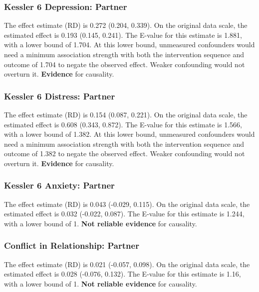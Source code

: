 \documentclass[
  singlecolumn]{article}
\begin{document}
\subsubsection{Kessler 6 Depression:
Partner}\label{kessler-6-depression-partner-18}

The effect estimate (RD) is 0.272 (0.204, 0.339). On the original data
scale, the estimated effect is 0.193 (0.145, 0.241). The E-value for
this estimate is 1.881, with a lower bound of 1.704. At this lower
bound, unmeasured confounders would need a minimum association strength
with both the intervention sequence and outcome of 1.704 to negate the
observed effect. Weaker confounding would not overturn it.
\textbf{Evidence} for causality.

\subsubsection{Kessler 6 Distress:
Partner}\label{kessler-6-distress-partner-18}

The effect estimate (RD) is 0.154 (0.087, 0.221). On the original data
scale, the estimated effect is 0.608 (0.343, 0.872). The E-value for
this estimate is 1.566, with a lower bound of 1.382. At this lower
bound, unmeasured confounders would need a minimum association strength
with both the intervention sequence and outcome of 1.382 to negate the
observed effect. Weaker confounding would not overturn it.
\textbf{Evidence} for causality.

\subsubsection{Kessler 6 Anxiety:
Partner}\label{kessler-6-anxiety-partner-18}

The effect estimate (RD) is 0.043 (-0.029, 0.115). On the original data
scale, the estimated effect is 0.032 (-0.022, 0.087). The E-value for
this estimate is 1.244, with a lower bound of 1. \textbf{Not reliable
evidence} for causality.

\subsubsection{Conflict in Relationship:
Partner}\label{conflict-in-relationship-partner-18}

The effect estimate (RD) is 0.021 (-0.057, 0.098). On the original data
scale, the estimated effect is 0.028 (-0.076, 0.132). The E-value for
this estimate is 1.16, with a lower bound of 1. \textbf{Not reliable
evidence} for causality.
\end{document}
